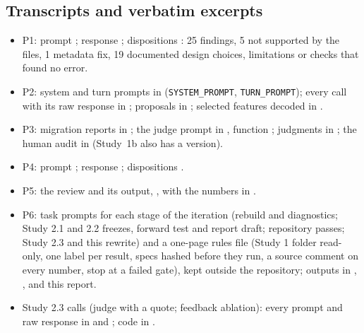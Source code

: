 \subsection{Transcripts and verbatim excerpts}\label{app:transcripts}
\begin{itemize}
  \item P1: prompt ; response ; dispositions : 25 findings, 5 not supported by the files, 1 metadata fix, 19 documented design choices, limitations or checks that found no error. %
  \item P2: system and turn prompts in  (\texttt{SYSTEM\_PROMPT}, \texttt{TURN\_PROMPT}); every call with its raw response in ; proposals in ; selected features decoded in .
  \item P3: migration reports in ; the judge prompt in , function ; judgments in ; the human audit in  (Study~1b also has a  version).
  \item P4: prompt ; response ; dispositions .
  \item P5: the review and its output, , with the numbers in .
  \item P6: task prompts for each stage of the iteration (rebuild and diagnostics; Study 2.1 and 2.2 freezes, forward test and report draft; repository passes; Study 2.3 and this rewrite) and a one-page rules file (Study 1 folder read-only, one label per result, specs hashed before they run, a source comment on every number, stop at a failed gate), kept outside the repository; outputs in , ,  and this report.
  \item Study 2.3 calls (judge with a quote; feedback ablation): every prompt and raw response in  and ; code in .
\end{itemize}

